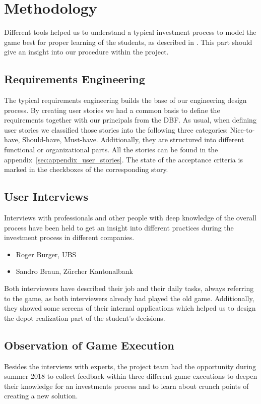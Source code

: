 \section{Methodology}
Different tools helped us to understand a typical investment process to model the game best for proper learning of the students, as described in . This part should give an insight into our procedure within the project.

\subsection{Requirements Engineering}
The typical requirements engineering builds the base of our engineering design process. By creating user stories we had a common basis to define the requirements together with our principals from the DBF. As usual, when defining user stories we classified those stories into the following three categories: Nice-to-have, Should-have, Must-have. Additionally, they are structured into different functional or organizational parts. All the stories can be found in the appendix~\ref{sec:appendix_user_stories}. The state of the acceptance criteria is marked in the checkboxes of the corresponding story.

\subsection{User Interviews}
Interviews with professionals and other people with deep knowledge of the overall process have been held to get an insight into different practices during the investment process in different companies.
\begin{itemize}
  \item Roger Burger, UBS
  \item Sandro Braun, Zürcher Kantonalbank
\end{itemize}

Both interviewers have described their job and their daily tasks, always referring to the game, as both interviewers already had played the old game. Additionally, they showed some screens of their internal applications which helped us to design the depot realization part of the student's decisions.

\subsection{Observation of Game Execution}
Besides the interviews with experts, the project team had the opportunity during summer 2018 to collect feedback within three different game executions to deepen their knowledge for an investments process and to learn about crunch points of creating a new solution. \\

